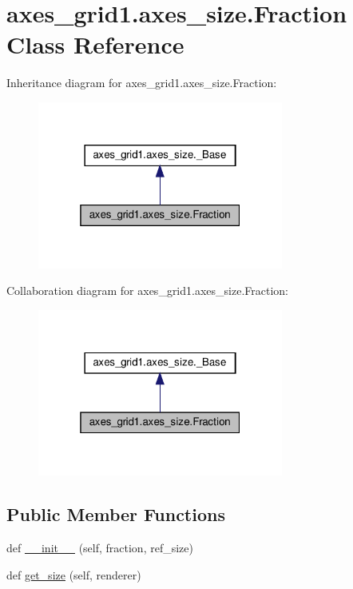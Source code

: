 \hypertarget{classaxes__grid1_1_1axes__size_1_1Fraction}{}\section{axes\+\_\+grid1.\+axes\+\_\+size.\+Fraction Class Reference}
\label{classaxes__grid1_1_1axes__size_1_1Fraction}


Inheritance diagram for axes\+\_\+grid1.\+axes\+\_\+size.\+Fraction\+:
\nopagebreak
\begin{figure}[H]
\begin{center}
\leavevmode
\includegraphics[width=229pt]{classaxes__grid1_1_1axes__size_1_1Fraction__inherit__graph}
\end{center}
\end{figure}


Collaboration diagram for axes\+\_\+grid1.\+axes\+\_\+size.\+Fraction\+:
\nopagebreak
\begin{figure}[H]
\begin{center}
\leavevmode
\includegraphics[width=229pt]{classaxes__grid1_1_1axes__size_1_1Fraction__coll__graph}
\end{center}
\end{figure}
\subsection*{Public Member Functions}
\begin{DoxyCompactItemize}
\item 
def \hyperlink{classaxes__grid1_1_1axes__size_1_1Fraction_a4b72e52b7898c44aa74cc7a4e8b27c06}{\+\_\+\+\_\+init\+\_\+\+\_\+} (self, fraction, ref\+\_\+size)
\item 
def \hyperlink{classaxes__grid1_1_1axes__size_1_1Fraction_a6a855fa8fa314ec5f877a2819aa0d128}{get\+\_\+size} (self, renderer)
\end{DoxyCompactItemize}


